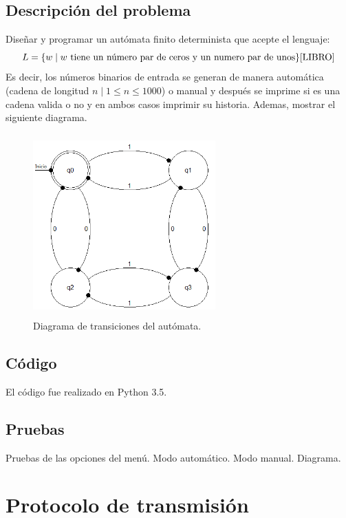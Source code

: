 \documentclass[12pt, titlepage]{article}
\begin{document}
	\subsection{Descripción del problema}
	Diseñar y programar un autómata finito determinista que acepte el lenguaje:
	\[ L = \lbrace w \mid w \text{ tiene un número par de ceros y un numero par de unos} \rbrace \text{\cite{LIBRO}}\] 
	Es decir, los números binarios de entrada se generan de manera automática (cadena de longitud $n \mid 1\leq n \leq 1000$) o manual y después se imprime si es una cadena valida o no y en ambos casos imprimir su historia. Ademas, mostrar el siguiente diagrama.
	\begin{figure}[ht]
		\begin{center}
			\includegraphics[width=7cm, height=7cm]{img/paridad.png}
			\caption{Diagrama de transiciones del autómata. \cite{LIBRO}}
			\label{fig:diagrama2}
		\end{center}
	\end{figure}
	\subsection{Código}
	El código fue realizado en Python 3.5.
	\subsection{Pruebas}
	Pruebas de las opciones del menú.
	{\large Modo automático.}
	{\large Modo manual.}
	{\large Diagrama.}
	
	\section{Protocolo de transmisión}
\end{document}
